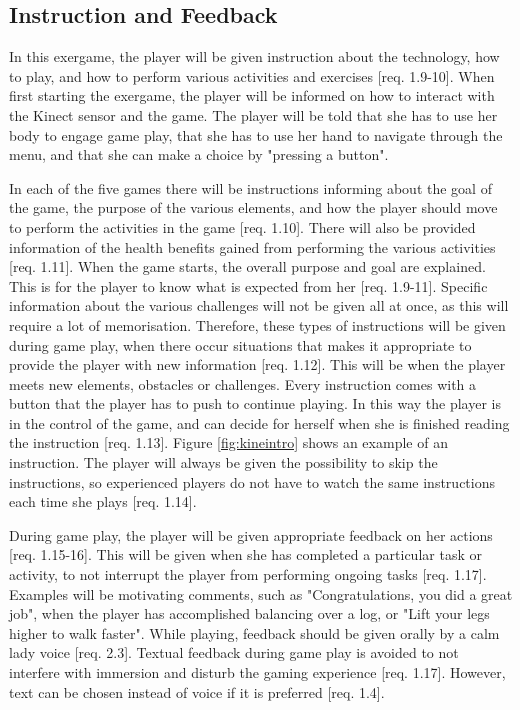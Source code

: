 \subsection{Instruction and Feedback}
In this exergame, the player will be given instruction about the technology, how to play, and how to perform various activities and exercises [req. 1.9-10]. When first starting the exergame, the player will be informed on how to interact with the Kinect sensor and the game. The player will be told that she has to use her body to engage game play, that she has to use her hand to navigate through the menu, and that she can make a choice by "pressing a button". 

In each of the five games there will be instructions informing about the goal of the game, the purpose of the various elements, and how the player should move to perform the activities in the game [req. 1.10]. There will also be provided information of the health benefits gained from performing the various activities [req. 1.11]. When the game starts, the overall purpose and goal are explained. This is for the player to know what is expected from her [req. 1.9-11]. Specific information about the various challenges will not be given all at once, as this will require a lot of memorisation. Therefore, these types of instructions will be given during game play, when there occur situations that makes it appropriate to provide the player with new information [req. 1.12]. This will be when the player meets new elements, obstacles or challenges. Every instruction comes with a button that the player has to push to continue playing. In this way the player is in the control of the game, and can decide for herself when she is finished reading the instruction [req. 1.13]. Figure \ref{fig:kineintro} shows an example of an instruction. The player will always be given the possibility to skip the instructions, so experienced players do not have to watch the same instructions each time she plays [req. 1.14].

During game play, the player will be given appropriate feedback on her actions [req. 1.15-16]. This will be given when she has completed a particular task or activity, to not interrupt the player from performing ongoing tasks [req. 1.17]. Examples will be motivating comments, such as "Congratulations, you did a great job", when the player has accomplished balancing over a log, or "Lift your legs higher to walk faster". While playing, feedback should be given orally by a calm lady voice [req. 2.3]. Textual feedback during game play is avoided to not interfere with immersion and disturb the gaming experience [req. 1.17].  However, text can be chosen instead of voice if it is preferred [req. 1.4]. 

